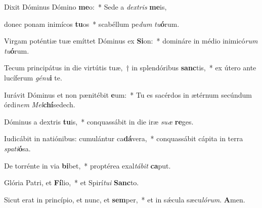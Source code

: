 \item Dixit Dóminus Dómino \textbf{me}o:~* Sede a \textit{dex}\textit{tris} \textbf{me}is,

\item donec ponam inimícos \textbf{tu}os~* scabéllum pe\textit{dum} \textit{tu}\textbf{ó}rum.

\item Virgam poténtiæ tuæ emíttet Dóminus ex \textbf{Si}on:~* domináre in médio inimicó\textit{rum} \textit{tu}\textbf{ó}rum.

\item Tecum principátus in die virtútis tuæ,~† in splendóribus \textbf{sanc}tis,~* ex útero ante lucíferum \textit{gé}\textit{nu}\textbf{i} te.

\item Iurávit Dóminus et non pænitébit \textbf{e}um:~* Tu es sacérdos in ætérnum secúndum órdi\textit{nem} \textit{Mel}\textbf{chí}sedech.

\item Dóminus a dextris \textbf{tu}is,~* conquassábit in die iræ \textit{su}\textit{æ} \textbf{re}ges.

\item Iudicábit in natiónibus: cumulántur ca\textbf{dá}vera,~* conquassábit cápita in terra \textit{spa}\textit{ti}\textbf{ó}sa.

\item De torrénte in via \textbf{bi}bet,~* proptérea exal\textit{tá}\textit{bit} \textbf{ca}put.

\item Glória Patri, et \textbf{Fí}lio,~* et Spirí\textit{tu}\textit{i} \textbf{Sanc}to.

\item Sicut erat in princípio, et nunc, et \textbf{sem}per,~* et in sǽcula sæcu\textit{ló}\textit{rum}. \textbf{A}men.